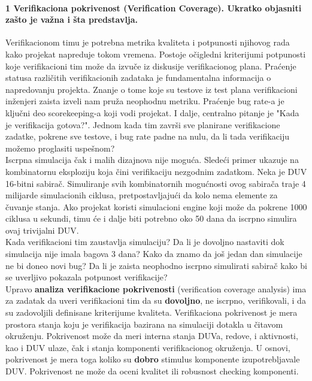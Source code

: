 \documentclass[a4paper, 12pt]{article}
\begin{document}
\paragraph{1 Verifikaciona pokrivenost (Verification Coverage). Ukratko objasniti zašto je važna i šta predstavlja.}
\hfill \break
\indent Verifikacionom timu je potrebna metrika kvaliteta i potpunosti njihovog rada kako projekat napreduje tokom vremena. Postoje očigledni kriterijumi potpunosti koje verifikacioni tim može da izvuče iz diskusije verifikacionog plana. Praćenje statusa različitih verifikacionih zadataka je fundamentalna informacija o napredovanju projekta. Znanje o tome koje su testove iz test plana verifikacioni inženjeri zaista izveli nam pruža neophodnu metriku. Praćenje bug rate-a je ključni deo scorekeeping-a koji vodi projekat. I dalje, centralno pitanje je "Kada je verifikacija gotova?". Jednom kada tim završi sve planirane verifikacione zadatke, pokrene sve testove, i bug rate padne na nulu, da li tada verifikaciju možemo proglasiti uspešnom?\\
\indent Iscrpna simulacija čak i malih dizajnova nije moguća. Sledeći primer ukazuje na kombinatornu eksploziju koja čini verifikaciju nezgodnim zadatkom. Neka je DUV 16-bitni sabirač. Simuliranje svih kombinatornih mogućnosti ovog sabirača traje 4 milijarde simulacionih ciklusa, pretpostavljajući da kolo nema elemente za čuvanje stanja. Ako projekat koristi simulacioni engine koji može da pokrene 1000 ciklusa u sekundi, timu će i dalje biti potrebno oko 50 dana da iscrpno simulira ovaj trivijalni DUV. \\
\indent Kada verifikacioni tim zaustavlja simulaciju? Da li je dovoljno nastaviti dok simulacija nije imala bagova 3 dana? Kako da znamo da još jedan dan simulacije ne bi doneo novi bug? Da li je zaista neophodno iscrpno simulirati sabirač kako bi se uverljivo pokazala potpunost verifikacije?\\
\indent Upravo \textbf{analiza verifikacione pokrivenosti} (verification coverage analysis) ima za zadatak da uveri verifikacioni tim da su \textbf{dovoljno}, ne iscrpno, verifikovali, i da su zadovoljili definisane kriterijume kvaliteta. Verifikaciona pokrivenost je mera prostora stanja koju je verifikacija bazirana na simulaciji dotakla u čitavom okruženju. Pokrivenost može da meri interna stanja DUVa, redove, i aktivnosti, kao i DUV ulaze, čak i stanja komponenti verifikacionog okruženja. U osnovi, pokrivenost je mera toga koliko su \textbf{dobro} stimulus komponente izupotrebljavale DUV. Pokrivenost ne može da oceni kvalitet ili robusnost checking komponenti.
\end{document}
